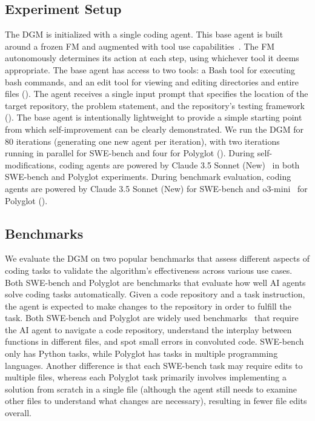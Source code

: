 \documentclass{article} %
\begin{document}
\subsection{Experiment Setup}
\label{sec:experiment-setup}

The DGM is initialized with a single coding agent. This base agent is built around a frozen FM and augmented with tool use capabilities~\citep{schick2023toolformer, anthropic_tool_use_2024}. The FM autonomously determines its action at each step, using whichever tool it deems appropriate. The base agent has access to two tools: a Bash tool for executing bash commands, and an edit tool for viewing and editing directories and entire files (). The agent receives a single input prompt that specifies the location of the target repository, the problem statement, and the repository's testing framework (). The base agent is intentionally lightweight to provide a simple starting point from which self-improvement can be clearly demonstrated. We run the DGM for 80 iterations (generating one new agent per iteration), with two iterations running in parallel for SWE-bench and four for Polyglot (). During self-modifications, coding agents are powered by Claude 3.5 Sonnet (New)~\citep{anthropic2024claude35sonnet} in both SWE-bench and Polyglot experiments. During benchmark evaluation, coding agents are powered by Claude 3.5 Sonnet (New) for SWE-bench and o3-mini~\citep{openai2025o3mini} for Polyglot ().

\subsection{Benchmarks}
\label{sec:benchmarks}

We evaluate the DGM on two popular benchmarks that assess different aspects of coding tasks to validate the algorithm's effectiveness across various use cases. Both SWE-bench and Polyglot are benchmarks that evaluate how well AI agents solve coding tasks automatically. Given a code repository and a task instruction, the agent is expected to make changes to the repository in order to fulfill the task. Both SWE-bench and Polyglot are widely used benchmarks~\citep{zhang2024autocoderover, zhang2024rest, xia2024agentless, cao2024spider2, GoogleDeepMind2025GeminiThinking,aider2024} that require the AI agent to navigate a code repository, understand the interplay between functions in different files, and spot small errors in convoluted code. SWE-bench only has Python tasks, while Polyglot has tasks in multiple programming languages. Another difference is that each SWE-bench task may require edits to multiple files, whereas each Polyglot task primarily involves implementing a solution from scratch in a single file (although the agent still needs to examine other files to understand what changes are necessary), resulting in fewer file edits overall.
\end{document}
